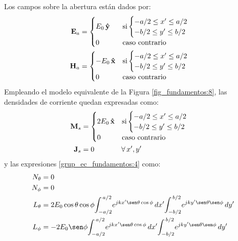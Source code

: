 Los campos sobre la abertura están dados por:
\begin{align}
\mathbf{E}_a &= 
\begin{cases}
\makebox[0pt][l]{$E_0\,\versor{y}$}\hphantom{-E_0\,\versor{x}} &\text{si}
\begin{cases} 
-a/2 \leq x' \leq a/2\\
-b/2 \leq y' \leq b/2
\end{cases}\\
0  &\text{caso contrario}
\end{cases}
\label{ec_apB:1}\\
\mathbf{H}_a &= 
\begin{cases} 
-E_0\,\versor{x} &\text{si}
\begin{cases} 
-a/2 \leq x' \leq a/2\\
-b/2 \leq y' \leq b/2
\end{cases}\\
0  & \text{caso contrario}
\end{cases}
\label{ec_apB:2}
\end{align}
Empleando el modelo equivalente de la Figura \ref{fig_fundamentos:8}, las densidades de corriente quedan expresadas como:
\begin{align}
\mathbf{M}_s &=
\begin{cases}
2E_0\,\versor{x} & \text{si}
\begin{cases} 
-a/2 \leq x' \leq a/2\\
-b/2 \leq y' \leq b/2
\end{cases}\\
0 & \text{caso contrario}
\end{cases}
\label{ec_apB:3}\\
\mathbf{J}_s &= \makebox[0pt][l]{$0$} 
\hphantom{\begin{cases} 2E_0\,\versor{x}\\0\end{cases}}\kern-\nulldelimiterspace
\forall\,x',y'
\label{ec_apB:4}
\end{align}
y las expresiones \eqref{grup_ec_fundamentos:4} como:
\begin{subequations}
\label{grup_ec_apB:1}
\begin{align}
N_{\theta} &= 0
\label{ec_apB:5}\\
N_{\phi} &= 0
\label{ec_apB:6}\\
L_{\theta} &= 2E_0\cos\theta\cos\phi\!\int_{-a/2}^{\,a/2}\!e^{jkx'\sen\theta\cos\phi}\,dx'\!\int_{-b/2}^{\,b/2}\!e^{jky'\sen\theta\sen\phi}\,dy'
\label{ec_apB:7}\\
L_{\phi} &= -2E_0\sen\phi\!\int_{-a/2}^{\,a/2}\!e^{jkx'\sen\theta\cos\phi}\,dx'\!\int_{-b/2}^{\,b/2}\!e^{jky'\sen\theta\sen\phi}\,dy'
\label{ec_apB:8}
\end{align}
\end{subequations}
